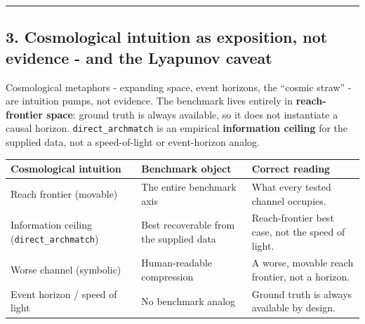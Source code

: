 \documentclass[
  11pt,
]{article}
\newcounter{none} %
\begin{document}
\begin{center}\rule{0.5\linewidth}{0.5pt}\end{center}

\subsection{3. Cosmological intuition as
exposition, not evidence - and the Lyapunov
caveat}\label{cosmological-intuition-as-exposition-not-evidence---and-the-lyapunov-caveat}

Cosmological metaphors - expanding space, event
horizons, the ``cosmic straw'' - are intuition
pumps, not evidence. The benchmark lives
entirely in \textbf{reach-frontier space}:
ground truth is always available, so it does not
instantiate a causal horizon.
\texttt{direct\_archmatch} is an empirical
\textbf{information ceiling} for the supplied
data, not a speed-of-light or event-horizon
analog.

{\def\LTcaptype{none} %
\begin{longtable}[]{@{}
  >{\raggedright\arraybackslash}p{}
  >{\raggedright\arraybackslash}p{}
  >{\raggedright\arraybackslash}p{}@{}}
\toprule\noalign{}
\begin{minipage}[b]{\linewidth}\raggedright
Cosmological intuition
\end{minipage} &
\begin{minipage}[b]{\linewidth}\raggedright
Benchmark object
\end{minipage} &
\begin{minipage}[b]{\linewidth}\raggedright
Correct reading
\end{minipage} \\
\midrule\noalign{}
\endhead
\bottomrule\noalign{}
\endlastfoot
Reach frontier (movable) & The entire benchmark
axis & What every tested channel occupies. \\
Information ceiling (\texttt{direct\_archmatch})
& Best recoverable from the supplied data &
Reach-frontier best case, not the speed of
light. \\
Worse channel (symbolic) & Human-readable
compression & A worse, movable reach frontier,
not a horizon. \\
Event horizon / speed of light & No benchmark
analog & Ground truth is always available by
design. \\
\end{longtable}
}
\end{document}
